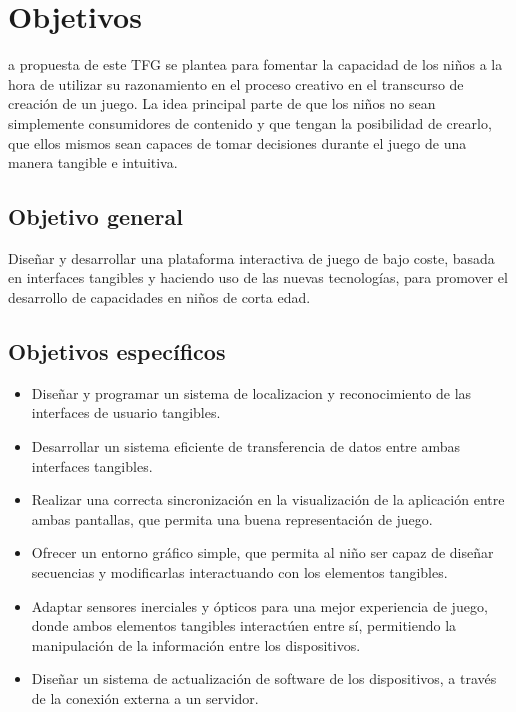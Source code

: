 \chapter{Objetivos}
\label{chap:objetivos}

\noindent
{}a propuesta de este TFG se plantea para fomentar la capacidad de los niños a la hora de utilizar su
razonamiento en el proceso creativo en el transcurso de creación de un juego. La idea principal parte de que los niños no sean simplemente consumidores de contenido y que tengan la posibilidad de crearlo, que ellos mismos sean capaces de tomar decisiones durante el juego de una manera tangible e intuitiva. 





\section{Objetivo general}

Diseñar y desarrollar una plataforma interactiva de juego de bajo coste, basada en interfaces tangibles y haciendo uso de las nuevas tecnologías, para promover el desarrollo de capacidades en niños de corta edad.

\section{Objetivos específicos}

\begin{itemize}
\item Diseñar y programar un sistema de localizacion y reconocimiento de las interfaces de usuario tangibles.

\item Desarrollar un sistema eficiente de transferencia de datos entre ambas interfaces tangibles.

\item Realizar una correcta sincronización en la visualización de la aplicación entre ambas pantallas, que permita una buena representación de juego.

\item Ofrecer un entorno gráfico simple, que permita al niño ser capaz de diseñar secuencias y modificarlas interactuando con los elementos tangibles.

\item Adaptar sensores inerciales y ópticos para una mejor experiencia de juego, donde ambos elementos tangibles interactúen entre sí, permitiendo la manipulación de la información entre los dispositivos.

\item Diseñar un sistema de actualización de software de los dispositivos, a través de la conexión externa a un servidor.
\end{itemize}



